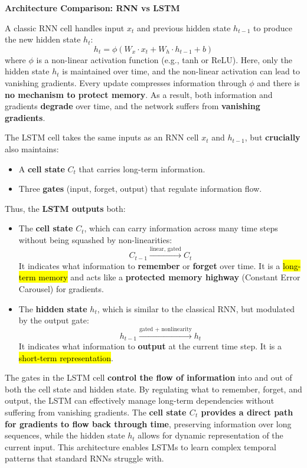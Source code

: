 \highspace
\begin{flushleft}
    \textcolor{DarkOrange3}{ \textbf{Architecture Comparison: RNN vs LSTM}}
\end{flushleft}
A classic RNN cell handles input $x_t$ and previous hidden state $h_{t-1}$ to produce the new hidden state $h_t$:
\begin{equation}
    h_t = \phi\left(W_x \cdot x_t + W_h \cdot h_{t-1} + b\right)
\end{equation}
where $\phi$ is a non-linear activation function (e.g., tanh or ReLU). Here, only the hidden state $h_t$ is maintained over time, and the non-linear activation can lead to vanishing gradients. Every update compresses information through $\phi$ and there is \textbf{no mechanism to protect memory}. As a result, both information and gradients \textbf{degrade} over time, and the network suffers from \textbf{vanishing gradients}.

\highspace
The LSTM cell takes the same inputs as an RNN cell $x_t$ and $h_{t-1}$, but \textbf{crucially} also maintains:
\begin{itemize}
    \item A \textbf{cell state} $C_t$ that carries long-term information.
    \item Three \textbf{gates} (input, forget, output) that regulate information flow.
\end{itemize}
Thus, the \textbf{LSTM outputs} both:
\begin{itemize}
    \item The \textbf{cell state} $C_t$, which can carry information across many time steps without being squashed by non-linearities:
    \begin{equation*}
        C_{t-1} \xrightarrow{\text{linear, gated}} C_t
    \end{equation*}
    It indicates what information to \textbf{remember} or \textbf{forget} over time. It is a \hl{long-term memory} and acts like a \textbf{protected memory highway} (Constant Error Carousel) for gradients.

    \item  The \textbf{hidden state} $h_t$, which is similar to the classical RNN, but modulated by the output gate:
    \begin{equation*}
        h_{t-1} \xrightarrow{\text{gated } + \text{ nonlinearity}} h_t
    \end{equation*}
    It indicates what information to \textbf{output} at the current time step. It is a \hl{short-term representation}.
\end{itemize}
The gates in the LSTM cell \textbf{control the flow of information} into and out of both the cell state and hidden state. By regulating what to remember, forget, and output, the LSTM can effectively manage long-term dependencies without suffering from vanishing gradients. The \textbf{cell state $C_t$ provides a direct path for gradients to flow back through time}, preserving information over long sequences, while the hidden state $h_t$ allows for dynamic representation of the current input. This architecture enables LSTMs to learn complex temporal patterns that standard RNNs struggle with.

